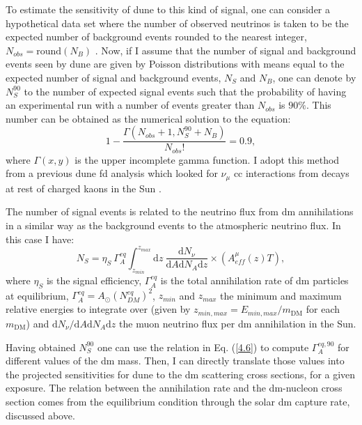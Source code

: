 To estimate the sensitivity of \gls{dune} to this kind of signal, one can consider a hypothetical data set where the number of observed neutrinos is taken to be the expected number of background events rounded to the nearest integer, $N_{obs} = \mathrm{round}(N_{B})$ \cite{Cowan2010}. Now, if I assume that the number of signal and background events seen by \gls{dune} are given by Poisson distributions with means equal to the expected number of signal and background events, $N_{S}$ and $N_{B}$, one can denote by $N_{S}^{90}$ to the number of expected signal events such that the probability of having an experimental run with a number of events greater than $N_{obs}$ is $90\%$. This number can be obtained as the numerical solution to the equation:
\begin{equation}\label{4.5}
	1 - \frac{\Gamma\left(N_{obs}+1, N_{S}^{90}+N_{B}\right)}{N_{obs}!} = 0.9,
\end{equation}
where $\Gamma(x,y)$ is the upper incomplete gamma function. I adopt this method from a previous \gls{dune} \gls{fd} analysis which looked for $\nu_{\mu}$ \gls{cc} interactions from decays at rest of charged kaons in the Sun \cite{DUNE2021}.

The number of signal events is related to the neutrino flux from \gls{dm} annihilations in a similar way as the background events to the atmospheric neutrino flux. In this case I have:
\begin{equation}\label{4.6}
	N_{S} = \eta_{S} \ \Gamma_{A}^{eq} \int_{z_{min}}^{z_{max}} \mathrm{d}z \ \frac{\mathrm{d}N_{\nu}}{\mathrm{d}A \mathrm{d}N_{A} \mathrm{d}z}  \times \left(A_{eff}^{\mu}(z) T\right),
\end{equation}
where $\eta_{S}$ is the signal efficiency, $\Gamma_{A}^{eq}$ is the total annihilation rate of \gls{dm} particles at equilibrium, $\Gamma_{A}^{eq} = A_{\odot} \left(N_{DM}^{eq}\right)^{2}$, $z_{min}$ and $z_{max}$ the minimum and maximum relative energies to integrate over (given by $z_{min, max} = E_{min, max}/m_{\mathrm{DM}}$ for each $m_{\mathrm{DM}}$) and $\mathrm{d}N_{\nu}/\mathrm{d}A \mathrm{d}N_{A} \mathrm{d}z$ the muon neutrino flux per \gls{dm} annihilation in the Sun.

Having obtained $N_{S}^{90}$ one can use the relation in Eq. (\ref{4.6}) to compute $\Gamma_{A}^{eq,90}$ for different values of the \gls{dm} mass. Then, I can directly translate those values into the projected sensitivities for \gls{dune} to the \gls{dm} scattering cross sections, for a given exposure. The relation between the annihilation rate and the \gls{dm}-nucleon cross section comes from the equilibrium condition through the solar \gls{dm} capture rate, discussed above.

